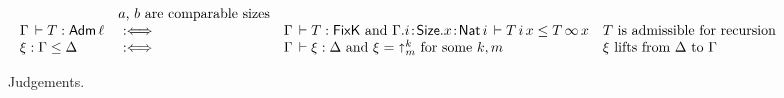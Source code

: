 \begin{figure}[htbp]
\[\begin{array}{l@{\quad}l@{\quad}l@{~}l@{~~}l}
    & \mbox{$a$, $b$ are comparable sizes} \\
  \Gamma \der T : \Adm \ell & \defas &
     \multicolumn 2 {@{}l@{\quad}}
       {\Gamma \der T : \FixK \mand \Gamma.i\of\Size.x\of\Nat i \der T\,i\,x \leq T\,\infty\,x}
    & \mbox{%
            $T$ is admissible for recursion} \\
  \xi : \Gamma \leq \Delta & \defas &
     \multicolumn 2 {@{}l@{\quad}}
       {\Gamma \der \xi : \Delta \mand \xi = \slift^k_m \mforsome k,m}
    & \mbox{$\xi$ lifts from $\Delta$ to $\Gamma$}
\end{array}
\]
  \caption{Judgements.}
  \label{fig:judge}
\end{figure}

